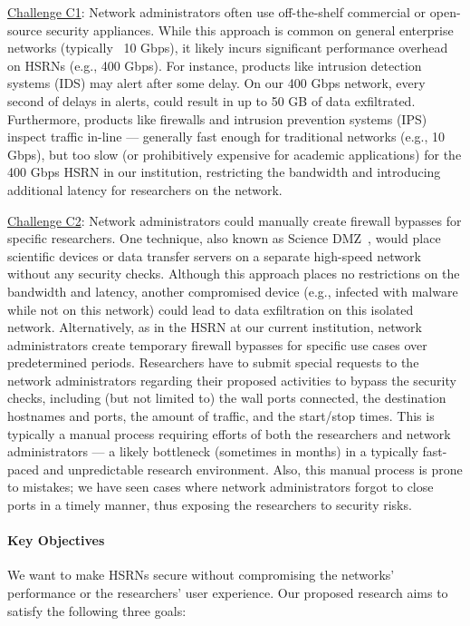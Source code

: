 \underline{Challenge C1}: Network administrators often use off-the-shelf commercial or open-source security appliances. While this approach is common on general enterprise networks (typically ~10 Gbps), it likely incurs significant performance overhead on HSRNs (e.g., 400 Gbps). For instance, products like intrusion detection systems (IDS) may alert after some delay. On our 400 Gbps network, every second of delays in alerts, could result in up to 50 GB of data exfiltrated. Furthermore, products like firewalls and intrusion prevention systems (IPS) inspect traffic in-line — generally fast enough for traditional networks (e.g., 10 Gbps), but too slow (or prohibitively expensive for academic applications) for the 400 Gbps HSRN in our institution, restricting the bandwidth and introducing additional latency for researchers on the network.

\underline{Challenge C2}: Network administrators could manually create firewall bypasses for specific researchers. One technique, also known as Science DMZ~\cite{dart2013science}, would place scientific devices or data transfer servers on a separate high-speed network without any security checks. Although this approach places no restrictions on the bandwidth and latency, another compromised device (e.g., infected with malware while not on this network) could lead to data exfiltration on this isolated network. Alternatively, as in the HSRN at our current institution, network administrators create temporary firewall bypasses for specific use cases over predetermined periods. Researchers have to submit special requests to the network administrators regarding their proposed activities to bypass the security checks, including (but not limited to) the wall ports connected, the destination hostnames and ports, the amount of traffic, and the start/stop times. This is typically a manual process requiring efforts of both the researchers and network administrators — a likely bottleneck (sometimes in months) in a typically fast-paced and unpredictable research environment. Also, this manual process is prone to mistakes; we have seen cases where network administrators forgot to close ports in a timely manner, thus exposing the researchers to security risks.

\paragraph{Key Objectives}
We want to make HSRNs secure without compromising the networks' performance or the researchers' user experience. Our proposed research aims to satisfy the following three goals:

